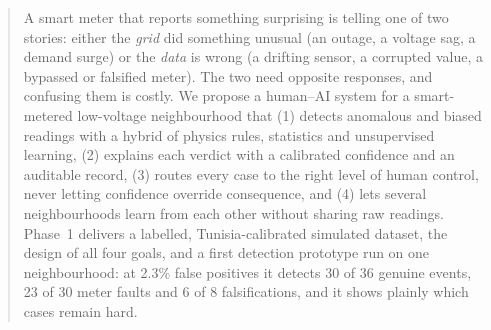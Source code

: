 \begin{abstract}
\noindent A smart meter that reports something surprising is telling one of two stories: either the
\emph{grid} did something unusual (an outage, a voltage sag, a demand surge) or the \emph{data} is wrong (a
drifting sensor, a corrupted value, a bypassed or falsified meter). The two need opposite responses, and
confusing them is costly. We propose a human--AI system for a smart-metered low-voltage neighbourhood that
(1) detects anomalous and biased readings with a hybrid of physics rules, statistics and unsupervised
learning, (2) explains each verdict with a calibrated confidence and an auditable record, (3) routes every
case to the right level of human control, never letting confidence override consequence, and (4) lets
several neighbourhoods learn from each other without sharing raw readings. Phase~1 delivers a labelled,
Tunisia-calibrated simulated dataset, the design of all four goals, and a first detection prototype run on
one neighbourhood: at 2.3\% false positives it detects 30 of 36 genuine events, 23 of 30 meter faults and
6 of 8 falsifications, and it shows plainly which cases remain hard.
\end{abstract}
